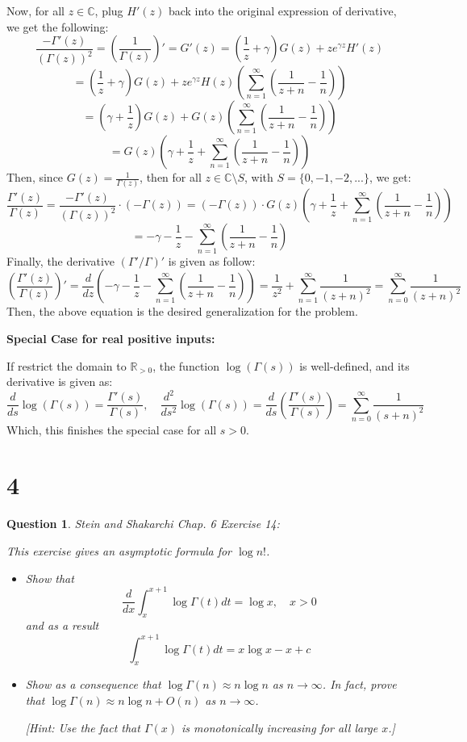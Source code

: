 \documentclass{article}
\newtheorem{question}{Question}
\begin{document}
Now, for all $z\in\mathbb{C}$, plug $H'(z)$ back into the original expression of derivative, we get the following:
$$\frac{-\Gamma'(z)}{(\Gamma(z))^2}=\left(\frac{1}{\Gamma(z)}\right)'=G'(z)=\left(\frac{1}{z}+\gamma\right)G(z)+ze^{\gamma z}H'(z)$$
$$=\left(\frac{1}{z}+\gamma\right)G(z)+ze^{\gamma z}H(z)\left(\sum_{n=1}^{\infty}\left(\frac{1}{z+n}-\frac{1}{n}\right)\right)$$
$$=\left(\gamma+\frac{1}{z}\right)G(z)+G(z)\left(\sum_{n=1}^{\infty}\left(\frac{1}{z+n}-\frac{1}{n}\right)\right)$$
$$=G(z)\left(\gamma+\frac{1}{z}+\sum_{n=1}^{\infty}\left(\frac{1}{z+n}-\frac{1}{n}\right)\right)$$
Then, since $G(z)=\frac{1}{\Gamma(z)}$, then for all $z\in\mathbb{C}\setminus S$, with $S=\{0,-1,-2,...\}$, we get:
$$\frac{\Gamma'(z)}{\Gamma(z)}=\frac{-\Gamma'(z)}{(\Gamma(z))^2}\cdot(-\Gamma(z)) = (-\Gamma(z))\cdot G(z)\left(\gamma+\frac{1}{z}+\sum_{n=1}^{\infty}\left(\frac{1}{z+n}-\frac{1}{n}\right)\right)$$
$$ = -\gamma-\frac{1}{z}-\sum_{n=1}^{\infty}\left(\frac{1}{z+n}-\frac{1}{n}\right)$$
Finally, the derivative $(\Gamma'/\Gamma)'$ is given as follow:
$$\left(\frac{\Gamma'(z)}{\Gamma(z)}\right)'=\frac{d}{dz}\left(-\gamma-\frac{1}{z}-\sum_{n=1}^{\infty}\left(\frac{1}{z+n}-\frac{1}{n}\right)\right)=\frac{1}{z^2}+\sum_{n=1}^{\infty}\frac{1}{(z+n)^2}=\sum_{n=0}^{\infty}\frac{1}{(z+n)^2}$$
Then, the above equation is the desired generalization for the problem.

\hfil

\textbf{Special Case for real positive inputs:}

If restrict the domain to $\mathbb{R}_{>0}$, the function $\log(\Gamma(s))$ is well-defined, and its derivative is given as:
$$\frac{d}{ds}\log(\Gamma(s))=\frac{\Gamma'(s)}{\Gamma(s)},\quad \frac{d^2}{ds^2}\log(\Gamma(s))=\frac{d}{ds}\left(\frac{\Gamma'(s)}{\Gamma(s)}\right)=\sum_{n=0}^{\infty}\frac{1}{(s+n)^2}$$
Which, this finishes the special case for all $s>0$.

\break

\section*{4}
\begin{myBox}[]{}
    \begin{question}
        Stein and Shakarchi Chap. 6 Exercise 14:

        This exercise gives an asymptotic formula for $\log n!$.
        \begin{itemize}
            \item[(a)] Show that
            $$\frac{d}{dx}\int_{x}^{x+1}\log\Gamma(t)dt = \log x,\quad x>0$$
            and as a result 
            $$\int_{x}^{x+1}\log\Gamma(t)dt = x\log x-x+c$$
            \item[(b)] Show as a consequence that $\log\Gamma(n)\approx n\log n$ as $n\rightarrow\infty$. 
            In fact, prove that $\log\Gamma(n)\approx n\log n+O(n)$ as $n\rightarrow\infty$. 

            [Hint: Use the fact that $\Gamma(x)$ is monotonically increasing for all large $x$.]
        \end{itemize}
    \end{question}
\end{myBox}
\end{document}
